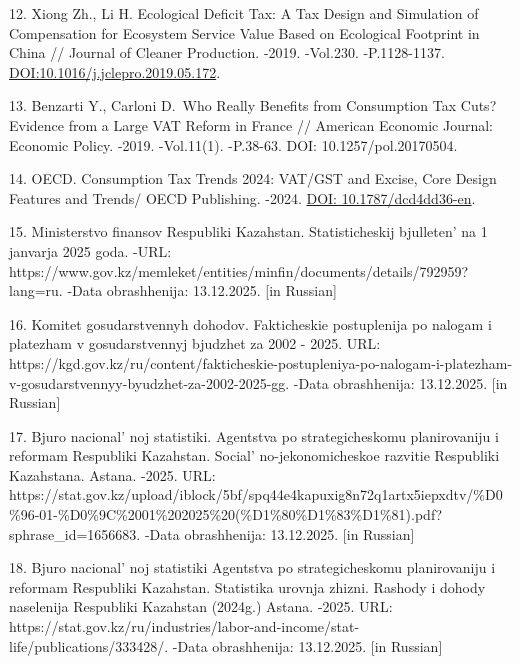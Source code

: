 \begin{refs}
12. Xiong Zh., Li H. Ecological Deficit Tax: A Tax Design and Simulation
of Compensation for Ecosystem Service Value Based on Ecological
Footprint in China // Journal of Cleaner Production. -2019. -Vol.230.
-P.1128-1137.
\href{https://doi.org/10.1016/j.jclepro.2019.05.172}{DOI:10.1016/j.jclepro.2019.05.172}.

13. Benzarti Y., Carloni D.~Who Really Benefits from Consumption Tax
Cuts? Evidence from a Large VAT Reform in France // American Economic
Journal: Economic Policy. -2019. -Vol.11(1). -P.38-63. DOI:
10.1257/pol.20170504.

14. OECD. Consumption Tax Trends 2024: VAT/GST and Excise, Core Design
Features and Trends/ OECD Publishing. -2024.
\href{https://doi.org/10.1787/dcd4dd36-en}{DOI: 10.1787/dcd4dd36-en}.

15. Ministerstvo finansov Respubliki Kazahstan. Statisticheskij
bjulleten'{} na 1 janvarja 2025 goda. -URL:
https://www.gov.kz/memleket/entities/minfin/documents/details/792959?lang=ru.
-Data obrashhenija: 13.12.2025. {[}in Russian{]}

16. Komitet gosudarstvennyh dohodov. Fakticheskie postuplenija po nalogam
i platezham v gosudarstvennyj bjudzhet za 2002 - 2025. URL:
https://kgd.gov.kz/ru/content/fakticheskie-postupleniya-po-nalogam-i-platezham-v-gosudarstvennyy-byudzhet-za-2002-2025-gg.
-Data obrashhenija: 13.12.2025. {[}in Russian{]}

17. Bjuro nacional' noj statistiki. Agentstva po
strategicheskomu planirovaniju i reformam Respubliki Kazahstan.
Social' no-jekonomicheskoe razvitie Respubliki
Kazahstana. Astana. -2025. URL:
https://stat.gov.kz/upload/iblock/5bf/spq44e4kapuxig8n72q1artx5iepxdtv/\%D0\%96-01-\%D0\%9C\%2001\%202025\%20(\%D1\%80\%D1\%83\%D1\%81).pdf?sphrase\_id=1656683.
-Data obrashhenija: 13.12.2025. {[}in Russian{]}

18. Bjuro nacional' noj statistiki Agentstva po
strategicheskomu planirovaniju i reformam Respubliki Kazahstan.
Statistika urovnja zhizni. Rashody i dohody naselenija Respubliki
Kazahstan (2024g.) Astana. -2025. URL:
https://stat.gov.kz/ru/industries/labor-and-income/stat-life/publications/333428/.
-Data obrashhenija: 13.12.2025. {[}in Russian{]}
\end{refs}

